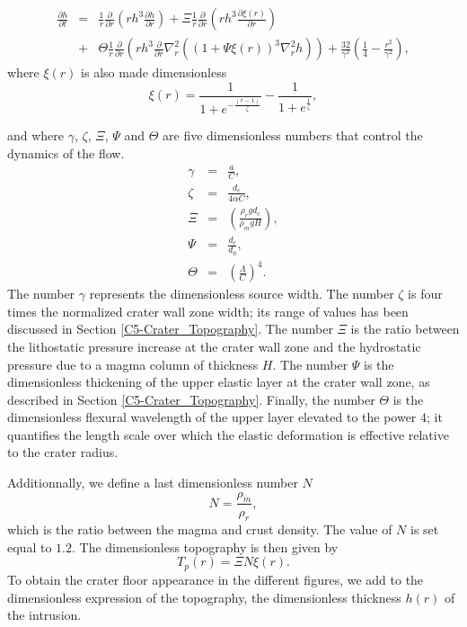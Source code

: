 \begin{eqnarray}
  \frac{\partial h}{\partial t}&=&\frac{1}{r} \frac{\partial}{\partial r}\left (rh^{3} \frac{\partial h}{\partial r} \right)+ \Xi \frac{1}{r} \frac{\partial}{\partial r}\left ( rh^{3}\frac{\partial \xi(r)}{\partial r}\right )\nonumber\\
                               &+&\Theta \frac{1}{r}\frac{\partial}{\partial r}\left ( rh^{3} \frac{\partial}{\partial r} \nabla^{2}_{r}\left ((1+\Psi \xi(r))^{3}\nabla^{2}_{r}h \right )\right)+ \frac{32}{\gamma^{2}} \left(\frac{1}{4}-\frac{r^{2}}{\gamma^{2}}\right),
                                   \label{C5-eq21}
\end{eqnarray}
where $\xi(r)$ is also made dimensionless
\begin{equation}
  \xi(r)=\frac{1}{1+e^{-\frac{(r-1)}{\zeta}}}-\frac{1}{1+e^{\frac{1}{\zeta}}},\label{C5-eqqqq}
\end{equation}

and  where $\gamma$,  $\zeta$,  $\Xi$, $\Psi$  and  $\Theta$ are  five
dimensionless numbers that control the dynamics of the flow.
\begin{eqnarray}
  \label{C5-Dimensionless1}
  \gamma&=&\frac{a}{C}, \label{C5-n1}\\
  \zeta&=&\frac{d_c}{4\alpha C},\label{C5-n2}\\
  \Xi&=& \left(\frac{\rho_r g d_{c}}{\rho_{m}gH}\right ),\label{C5-n3}\\
  \Psi&=&\frac{d_{c}}{d_0},\label{C5-n4}\\
  \Theta&=&\left ( \frac{\Lambda}{C} \right )^{4}.\label{C5-n5} 
\end{eqnarray}
The  number $\gamma$  represents the  dimensionless source  width. The
number $\zeta$  is four times  the normalized crater wall  zone width;
its    range   of    values    has   been    discussed   in    Section
\ref{C5-Crater_Topography}.  The number $\Xi$ is the ratio between the
lithostatic  pressure  increase  at  the  crater  wall  zone  and  the
hydrostatic  pressure due  to a  magma column  of thickness  $H$.  The
number $\Psi$  is the  dimensionless thickening  of the  upper elastic
layer   at   the  crater   wall   zone,   as  described   in   Section
\ref{C5-Crater_Topography}.   Finally,  the  number  $\Theta$  is  the
dimensionless flexural wavelength  of the upper layer  elevated to the
power  $4$; it  quantifies the  length  scale over  which the  elastic
deformation is effective relative to the crater radius.
	
Additionnally, we define a last dimensionless number $N$
\begin{equation}
  N=\frac{\rho_m}{\rho_r},
\end{equation}
which is the  ratio between the magma and crust  density. The value of
$N$ is set  equal to $1.2$. The dimensionless  topography is then
given by
\begin{equation}
  T_p(r)=\Xi N \xi(r).
  \label{C5-TopoFinal}
\end{equation}
To obtain the crater floor appearance in the different figures, we add
to the  dimensionless expression of the  topography, the dimensionless
thickness $h(r)$ of the intrusion.
	 
